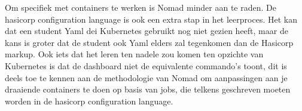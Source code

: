 Om specifiek met containers te werken is Nomad minder aan te raden. De hasicorp configuration language is ook een extra stap in het leerproces. Het kan dat een student Yaml dei Kubernetes gebruikt nog niet gezien heeft, maar de kans is groter dat de student ook Yaml elders zal tegenkomen dan de Hasicorp markup. Ook iets dat het leren ten nadele zou komen ten opzichte van Kubernetes is dat de dashboard niet de equivalente commando’s toont, dit is deels toe te kennen aan de methodologie van Nomad om aanpassingen aan je draaiende containers te doen op basis van jobs, die telkens geschreven moeten worden in de hasicorp configuration language.
